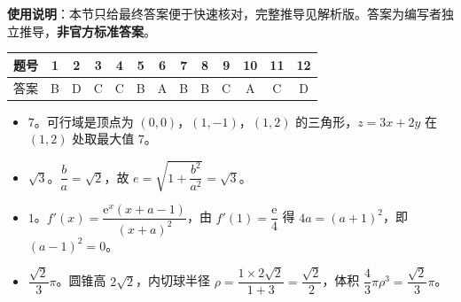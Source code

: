 
\begin{gknotice}
\textbf{使用说明}：本节只给最终答案便于快速核对，完整推导见解析版。答案为编写者独立推导，\textbf{非官方标准答案}。
\end{gknotice}

\begin{center}\begin{tabular}{ccccccccccccc}
\toprule
题号 & 1 & 2 & 3 & 4 & 5 & 6 & 7 & 8 & 9 & 10 & 11 & 12 \\
\midrule
答案 & B & D & C & C & B & A & B & B & C & A & C & D \\
\bottomrule
\end{tabular}\end{center}

\begin{itemize}[leftmargin=2.6em]
  \item[\textbf{13.}] $7$。可行域是顶点为 $(0,0)$，$(1,-1)$，$(1,2)$ 的三角形，$z=3x+2y$ 在 $(1,2)$ 处取最大值 $7$。
  \item[\textbf{14.}] $\sqrt3$。$\dfrac ba=\sqrt2$，故 $e=\sqrt{1+\dfrac{b^2}{a^2}}=\sqrt3$。
  \item[\textbf{15.}] $1$。$f'(x)=\dfrac{\mathrm e^x(x+a-1)}{(x+a)^2}$，由 $f'(1)=\dfrac{\mathrm e}4$ 得 $4a=(a+1)^2$，即 $(a-1)^2=0$。
  \item[\textbf{16.}] $\dfrac{\sqrt2}3\pi$。圆锥高 $2\sqrt2$，内切球半径 $\rho=\dfrac{1\times2\sqrt2}{1+3}=\dfrac{\sqrt2}2$，体积 $\dfrac43\pi\rho^3=\dfrac{\sqrt2}3\pi$。
\end{itemize}

